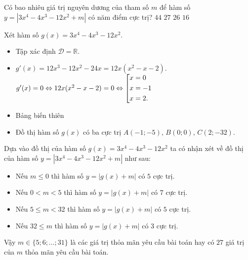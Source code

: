 \begin{ex}%
 Có bao nhiêu giá trị nguyên dương của tham số $m$ để hàm số $y = \left| 3x^4 - 4x^3 - 12x^2 + m \right|$ có năm điểm cực trị?
 \choice
  {$44$}
  {\True $27$}
  {$26$}
  {$16$}
 \loigiai
  {
  Xét hàm số $g(x)= 3x^4 - 4x^3 - 12x^2$.
  \begin{itemize}
   \item Tập xác định $\mathscr{D} = \mathbb{R}$.
   \item $g'(x) = 12x^3 - 12x^2 - 24x = 12x(x^2 - x - 2)$.\\
   $g'(x) = 0 \Leftrightarrow 12x(x^2 - x - 2) = 0 \Leftrightarrow \left[\begin{aligned}& x = 0 \\& x = -1 \\& x = 2.\end{aligned}\right.$
   \item Bảng biến thiên
   \begin{center}
   \end{center}
   \item Đồ thị hàm số $g(x)$ có ba cực trị $A(-1;-5)$, $B(0;0)$, $C(2;-32)$.
  \end{itemize}
  Dựa vào đồ thị của hàm số $g(x)= 3x^4 - 4x^3 - 12x^2$ ta có nhận xét về đồ thị của hàm số $y = \left| 3x^4 - 4x^3 - 12x^2 + m \right|$ như sau:
  \begin{itemize}
   \item Nếu $m \leq 0$ thì hàm số $y = |g(x) + m|$ có $5$ cực trị.
   \item Nếu $0 < m < 5$ thì hàm số $y = |g(x) + m|$ có $7$ cực trị.
   \item Nếu $5 \leq m < 32$ thì hàm số $y = |g(x) + m|$ có $5$ cực trị.
   \item Nếu $32 \leq m$ thì hàm số $y = |g(x )+ m|$ có $3$ cực trị.
  \end{itemize}
  Vậy $m \in \{5; 6; \ldots; 31\}$ là các giá trị thỏa mãn yêu cầu bài toán hay có $27$ giá trị của $m$ thỏa mãn yêu cầu bài toán.
  }
\end{ex}


